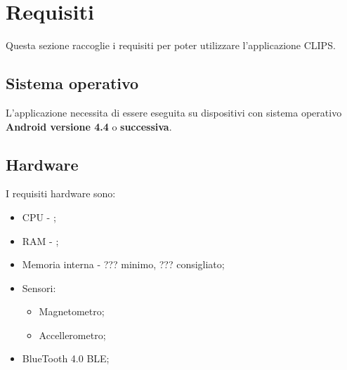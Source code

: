 \documentclass[../ClipsManualeUtente.tex]{subfiles}
\begin{document}
\section{Requisiti}
	Questa sezione raccoglie i requisiti per poter utilizzare l'applicazione CLIPS.
	
	\subsection{Sistema operativo}
		L'applicazione necessita di essere eseguita su dispositivi con sistema operativo \textbf{Android versione 4.4} o \textbf{successiva}.
	
	\subsection{Hardware}
		I requisiti hardware sono:
		\begin{itemize}
			\item CPU - ;
			\item RAM - ;
			\item Memoria interna - ??? minimo, ??? consigliato;
			\item Sensori:
			\begin{itemize}
				\item Magnetometro;
				\item Accellerometro;
			\end{itemize}
			\item BlueTooth 4.0 BLE;
			
		\end{itemize}
		
	
		
\end{document}
